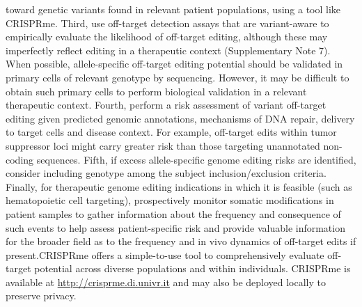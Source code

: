 \documentclass[a4paper, titlepage, openright]{book}
\newcommand{\crisprme}{CRISPRme\xspace}
\begin{document}
toward genetic variants found in relevant patient populations, using a tool like \crisprme \citep{cancellieri2023human}. Third, use off-target detection assays that are variant-aware to empirically evaluate the likelihood of off-target editing, although these may imperfectly reflect editing in a therapeutic context (Supplementary Note 7). When possible, allele-specific off-target editing potential should be validated in primary cells of relevant genotype by sequencing. However, it may be difficult to obtain such primary cells to perform biological validation in a relevant therapeutic context. Fourth, perform a risk assessment of variant off-target editing given predicted genomic annotations, mechanisms of DNA repair, delivery to target cells and disease context. For example, off-target edits within tumor suppressor loci might carry greater risk than those targeting unannotated non-coding sequences. Fifth, if excess allele-specific genome editing risks are identified, consider including genotype among the subject inclusion/exclusion criteria. Finally, for therapeutic genome editing indications in which it is feasible (such as hematopoietic cell targeting), prospectively monitor somatic modifications in patient samples to gather information about the frequency and consequence of such events to help assess patient-specific risk and provide valuable information for the broader field as to the frequency and in vivo dynamics of off-target edits if present.\crisprme offers a simple-to-use tool to comprehensively evaluate off-target potential across diverse populations and within individuals. \crisprme is available at \url{http://crisprme.di.univr.it} and may also be deployed locally to preserve privacy.


\end{document}
